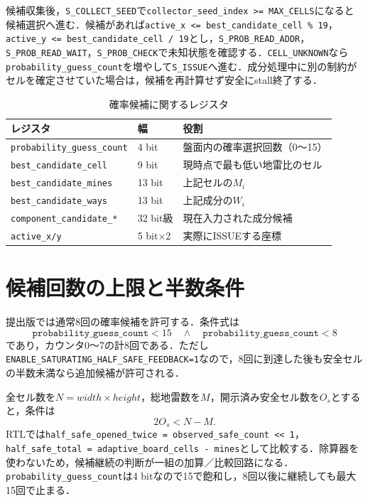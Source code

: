 候補収集後，\texttt{S\_COLLECT\_SEED}で\texttt{collector\_seed\_index >= MAX\_CELLS}になると候補選択へ進む．候補があれば\texttt{active\_x <= best\_candidate\_cell \% 19}，\texttt{active\_y <= best\_candidate\_cell / 19}とし，\texttt{S\_PROB\_READ\_ADDR}，\texttt{S\_PROB\_READ\_WAIT}，\texttt{S\_PROB\_CHECK}で未知状態を確認する．\texttt{CELL\_UNKNOWN}なら\texttt{probability\_guess\_count}を増やして\texttt{S\_ISSUE}へ進む．成分処理中に別の制約がセルを確定させていた場合は，候補を再計算せず安全にstall終了する．

\begin{table}[tb]
\centering
\caption{確率候補に関するレジスタ}
\label{tab:probability-registers}
\begin{tabularx}{\linewidth}{llX}
\toprule
レジスタ & 幅 & 役割\\
\midrule
\texttt{probability\_guess\_count} & 4 bit & 盤面内の確率選択回数（0〜15）\\
\texttt{best\_candidate\_cell} & 9 bit & 現時点で最も低い地雷比のセル\\
\texttt{best\_candidate\_mines} & 13 bit & 上記セルの$M_i$\\
\texttt{best\_candidate\_ways} & 13 bit & 上記成分の$W_i$\\
\texttt{component\_candidate\_*} & 32 bit級 & 現在入力された成分候補\\
\texttt{active\_x/y} & 5 bit×2 & 実際にISSUEする座標\\
\bottomrule
\end{tabularx}
\end{table}

\section{候補回数の上限と半数条件}
\label{sec:half-safe-condition}

提出版では通常8回の確率候補を許可する．条件式は
\begin{equation}
  \texttt{probability\_guess\_count}<15
  \quad\land\quad
  \texttt{probability\_guess\_count}<8
  \label{eq:base-probability-condition}
\end{equation}
であり，カウンタ0〜7の計8回である．ただし\texttt{ENABLE\_SATURATING\_HALF\_SAFE\_FEEDBACK=1}なので，8回に到達した後も安全セルの半数未満なら追加候補が許可される．

全セル数を$N=width\times height$，総地雷数を$M$，開示済み安全セル数を$O_s$とすると，条件は
\begin{equation}
  2O_s<N-M.
  \label{eq:half-safe-condition}
\end{equation}
RTLでは\texttt{half\_safe\_opened\_twice = observed\_safe\_count << 1}，\texttt{half\_safe\_total = adaptive\_board\_cells - mines}として比較する．除算器を使わないため，候補継続の判断が一組の加算／比較回路になる．\texttt{probability\_guess\_count}は4 bitなので15で飽和し，8回以後に継続しても最大15回で止まる．

